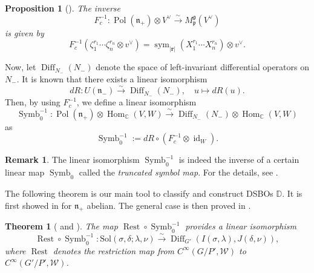 \documentclass[a4paper,11pt,reqno]{amsart}
\newcommand{\frakg}{\mathfrak{g}}
\newcommand{\frakn}{\mathfrak{n}}
\newcommand{\frakp}{\mathfrak{p}}
\newcommand{\CC}{\mathbb{C}}
\newcommand{\DD}{\mathbb{D}}
\newcommand{\0}{{\bf 0}}
\newcommand{\1}{{\bf 1}}
\DeclareMathOperator{\Hom}{Hom}
\DeclareMathOperator{\Pol}{Pol}
\DeclareMathOperator{\id}{id}
\DeclareMathOperator{\Diff}{Diff}
\newcommand{\Mp}{M^{\frakg}_{\frakp}}
\DeclareMathOperator{\To}{\longrightarrow}
\DeclareMathOperator{\Symb}{Symb}
\DeclareMathOperator{\Rest}{Rest}
\DeclareMathOperator{\sym}{sym}
\theoremstyle{plain}
\newtheorem{theorem}[equation]{Theorem}
\newtheorem{proposition}[equation]{Proposition}
\theoremstyle{definition}
\newtheorem{remark}[equation]{Remark}
\numberwithin{equation}{section}
\theoremstyle{definition}
\begin{document}
\begin{proposition}[{\cite[Cor.\ 3.30]{KPV25}}]
\label{prop:Fc}
The inverse 
\begin{equation*}
F_c^{-1}\colon \Pol(\frakn_+)\otimes V^\vee
\stackrel{\sim}{\To} 
 \Mp(V^\vee)
\end{equation*}
is given by
\begin{equation*}
F_c^{-1}(\zeta_1^{r_1}\cdots \zeta_n^{r_n}\otimes v^\vee) =
\sym_{|\mathbf{r}|}(X_1^{r_1}\cdots X_n^{r_n})\otimes v^\vee.
\end{equation*}
\end{proposition}

Now, let $\Diff_{N_-}(N_-)$ denote the space of left-invariant differential operators
on $N_-$. It is known that there exists a linear isomorphism
\begin{equation}\label{eqn:U_Diff_N}
dR\colon U(\frakn_-) \stackrel{\sim}{\To} \Diff_{N_-}(N_-),
\quad
u \mapsto dR(u).
\end{equation}
Then, by using $F_c^{-1}$,  we define a linear isomorphism
\begin{equation*}
\Symb_0^{-1} \colon\Pol(\frakn_+)\otimes \Hom_\CC(V,W) \stackrel{\sim}{\To} 
\Diff_{N_-}(N_-) \otimes \Hom_\CC(V,W)
\end{equation*}
as
\begin{equation}\label{eqn:invSymb}
\Symb_0^{-1} := dR \circ (F_c^{-1}\otimes \id_{W}).
\end{equation}

\begin{remark}
The linear isomorphism $\Symb_0^{-1}$ is indeed the inverse of a certain linear map $\Symb_0$ called the \emph{truncated symbol map}. For the details, see \cite{KPV25}.
\end{remark}

The following theorem is our main tool to classify and construct 
DSBOs $\DD$. It is first showed in \cite{KoPe16a} for 
$\frakn_+$ abelian. The general case is then proved in \cite{KPV25}.

\begin{theorem}[{\cite[Thm.\ 4.1]{KoPe16a} and \cite[Thm.\ 3.32]{KPV25}}]
\label{thm:symb}
The map $\Rest \circ \Symb_0^{-1}$ provides a linear isomorphism
\begin{equation}\label{eqn:RestSymb0}
\Rest \circ \Symb_0^{-1} \colon 
\mathrm{Sol}(\sigma,\delta;\lambda,\nu) \stackrel{\sim}{\To} 
\Diff_{G'}(I(\sigma,\lambda),J(\delta,\nu)),
\end{equation}
where $\Rest$ denotes the restriction map 
from $C^\infty(G/P',\mathcal{W})$ to $C^\infty(G'/P',\mathcal{W})$.
\end{theorem}
\end{document}
